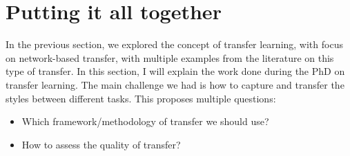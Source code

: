
\section{Putting it all together}
  \par In the previous section, we explored the concept of transfer learning, with focus on network-based transfer, with multiple examples from the literature on this type of transfer. In this section, I will explain the work done during the PhD on transfer learning. The main challenge we had is how to capture and transfer the styles between different tasks. This proposes multiple questions:
  \begin{itemize}
    \item Which framework/methodology of transfer we should use?
    \item How to assess the quality of transfer?
  \end{itemize}

